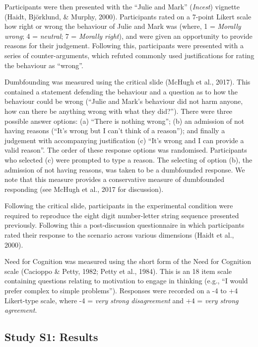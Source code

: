 \documentclass[
  american,
  man,floatsintext]{apa7}
\begin{document}
Participants were then presented with the \enquote{Julie and Mark} (\emph{Incest}) vignette (Haidt, Björklund, \& Murphy, 2000). Participants rated on a 7-point Likert scale how right or wrong the behaviour of Julie and Mark was (where, 1 = \emph{Morally wrong}; 4 = \emph{neutral}; 7 = \emph{Morally right}), and were given an opportunity to provide reasons for their judgement. Following this, participants were presented with a series of counter-arguments, which refuted commonly used justifications for rating the behaviour as \enquote{wrong}.

Dumbfounding was measured using the critical slide (McHugh et al., 2017). This contained a statement defending the behaviour and a question as to how the behaviour could be wrong (\enquote{Julie and Mark's behaviour did not harm anyone, how can there be anything wrong with what they did?}). There were three possible answer options: (a) \enquote{There is nothing wrong}; (b) an admission of not having reasons (\enquote{It's wrong but I can't think of a reason}); and finally a judgement with accompanying justification (c) \enquote{It's wrong and I can provide a valid reason}. The order of these response options was randomised. Participants who selected (c) were prompted to type a reason. The selecting of option (b), the admission of not having reasons, was taken to be a dumbfounded response. We note that this measure provides a conservative measure of dumbfounded responding (see McHugh et al., 2017 for discussion).

Following the critical slide, participants in the experimental condition were required to reproduce the eight digit number-letter string sequence presented previously. Following this a post-discussion questionnaire in which participants rated their response to the scenario across various dimensions (Haidt et al., 2000).

Need for Cognition was measured using the short form of the Need for Cognition scale (Cacioppo \& Petty, 1982; Petty et al., 1984). This is an 18 item scale containing questions relating to motivation to engage in thinking (e.g., \enquote{I would prefer complex to simple problems}). Responses were recorded on a -4 to +4 Likert-type scale, where -4 = \emph{very strong disagreement} and +4 = \emph{very strong agreement}.

\hypertarget{study-s1-results}{%
\subsection{Study S1: Results}\label{study-s1-results}}
\end{document}

